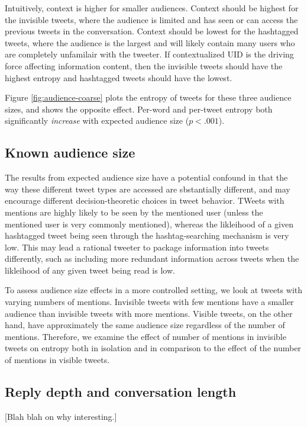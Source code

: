 \documentclass[11pt,letterpaper]{article}
\begin{document}
Intuitively, context is higher for smaller audiences. Context should be highest for the invisible tweets, where the audience is limited and has seen or can access the previous tweets in the conversation.  Context should be lowest for the hashtagged tweets, where the audience is the largest and will likely contain many users who are completely unfamilair with the tweeter.  If contextualized UID is the driving force affecting information content, then the invisible tweets should have the highest entropy and hashtagged tweets should have the lowest.

Figure \ref{fig:audience-coarse} plots the entropy of tweets for these three audience sizes, and shows the opposite effect.  Per-word and per-tweet entropy both significantly {\it increase} with expected audience size ($p < .001$).

\subsection{Known audience size}
The results from expected audience size have a potential confound in that the way these different tweet types are accessed are sbstantially different, and may encourage different decision-theoretic choices in tweet behavior.  TWeets with mentions are highly likely to be seen by the mentioned user (unless the mentioned user is very commonly mentioned), whereas the likleihood of a given hashtagged tweet being seen through the hashtag-searching mechanism is very low.  This may lead a rational tweeter to package information into tweets differently, such as including more redundant information across tweets when the likleihood of any given tweet being read is low.

To assess audience size effects in a more controlled setting, we look at tweets with varying numbers of mentions.  Invisible tweets with few mentions have a smaller audience than invisible tweets with more mentions.  Visible tweets, on the other hand, have approximately the same audience size regardless of the number of mentions.  Therefore, we examine the effect of number of mentions in invisible tweets on entropy both in isolation and in comparison to the effect of the number of mentions in visible tweets.


\subsection{Reply depth and conversation length}
[Blah blah on why interesting.]
\end{document}
